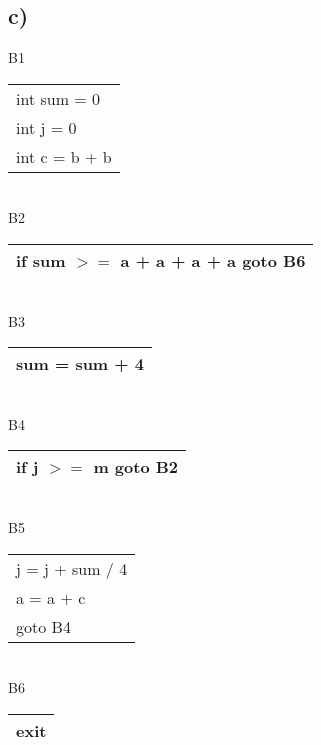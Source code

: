 \subsection*{c)}
B1\begin{tabular}{|l|}
\hline
int sum = 0	\\
int j = 0	\\
int c = b + b	\\
\hline
\end{tabular}	\\
B2\begin{tabular}{|l|}
\hline
if sum $>=$ a + a + a + a goto B6	\\
\hline
\end{tabular}	\\
B3\begin{tabular}{|l|}
\hline
sum = sum + 4	\\
\hline
\end{tabular}		\\
B4\begin{tabular}{|l|}
\hline
if j $>=$ m goto B2	\\
\hline
\end{tabular}	\\
B5\begin{tabular}{|l|}
\hline
j = j + sum / 4	\\
a = a + c	\\
goto B4		\\
\hline
\end{tabular}	\\
B6\begin{tabular}{|l|}
\hline
exit	\\
\hline
\end{tabular}	\\

